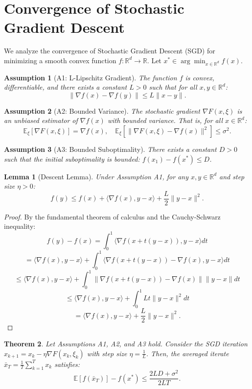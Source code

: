 \documentclass[11pt]{article}
\newtheorem{theorem}{Theorem}
\newtheorem{lemma}[theorem]{Lemma}
\newtheorem{assumption}{Assumption}
\begin{document}
\section{Convergence of Stochastic Gradient Descent}
We analyze the convergence of Stochastic Gradient Descent (SGD) for minimizing a smooth convex function $f: \mathbb{R}^d \to \mathbb{R}$. Let $x^* \in \arg\min_{x \in \mathbb{R}^d} f(x)$.

\begin{assumption}[A1: L-Lipschitz Gradient]
The function $f$ is convex, differentiable, and there exists a constant $L > 0$ such that for all $x, y \in \mathbb{R}^d$:
\[
\|\nabla f(x) - \nabla f(y)\| \le L \|x - y\|.
\]
\end{assumption}

\begin{assumption}[A2: Bounded Variance]
The stochastic gradient $\nabla F(x, \xi)$ is an unbiased estimator of $\nabla f(x)$ with bounded variance. That is, for all $x \in \mathbb{R}^d$:
\[
\mathbb{E}_\xi[\nabla F(x, \xi)] = \nabla f(x), \quad \mathbb{E}_\xi[\|\nabla F(x, \xi) - \nabla f(x)\|^2] \le \sigma^2.
\]
\end{assumption}

\begin{assumption}[A3: Bounded Suboptimality]
There exists a constant $D > 0$ such that the initial suboptimality is bounded: $f(x_1) - f(x^*) \le D$.
\end{assumption}

\begin{lemma}[Descent Lemma]
Under Assumption A1, for any $x, y \in \mathbb{R}^d$ and step size $\eta > 0$:
\[
f(y) \le f(x) + \langle \nabla f(x), y - x \rangle + \frac{L}{2} \|y - x\|^2.
\]
\end{lemma}

\begin{proof}
By the fundamental theorem of calculus and the Cauchy-Schwarz inequality:
\[
f(y) - f(x) = \int_0^1 \langle \nabla f(x + t(y-x)), y - x \rangle dt
\]
\[
= \langle \nabla f(x), y - x \rangle + \int_0^1 \langle \nabla f(x + t(y-x)) - \nabla f(x), y - x \rangle dt
\]
\[
\le \langle \nabla f(x), y - x \rangle + \int_0^1 \|\nabla f(x + t(y-x)) - \nabla f(x)\| \|y - x\| dt
\]
\[
\le \langle \nabla f(x), y - x \rangle + \int_0^1 L t \|y - x\|^2 dt
\]
\[
= \langle \nabla f(x), y - x \rangle + \frac{L}{2} \|y - x\|^2.
\]
\end{proof}

\begin{theorem}
Let Assumptions A1, A2, and A3 hold. Consider the SGD iteration $x_{k+1} = x_k - \eta \nabla F(x_k, \xi_k)$ with step size $\eta = \frac{1}{L}$. Then, the averaged iterate $\bar{x}_T = \frac{1}{T} \sum_{k=1}^T x_k$ satisfies:
\[
\mathbb{E}[f(\bar{x}_T)] - f(x^*) \le \frac{2LD + \sigma^2}{2LT}.
\]
\end{theorem}
\end{document}
